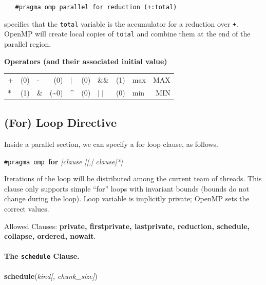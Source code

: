 \documentclass[a4paper]{report}
\begin{document}
\verb!   #pragma omp parallel for reduction (+:total)!

\noindent
specifies that the {\tt total} variable is the accumulator for a
reduction over {\tt +}. OpenMP will create local copies of {\tt total} and 
combine them at the end of the parallel region.

{\bf Operators (and their associated initial value)}
  \begin{center}
    \begin{tabular}{l r | l r | l r | l r | l r}
      + & (0) & -  &  (0) &    $\mid$ & (0) & \&\& & (1) & max & MAX\\
      * & (1) & \& & (\~{}0) & \^{} & (0) &   $\mid\mid$ & (0) & min & MIN\\ 
    \end{tabular}
  \end{center}

\subsection*{(For) Loop Directive} Inside a parallel section, we can
specify a for loop clause, as follows.

  \begin{center}
    {\tt \#pragma omp }{\bf for} {\it [clause [[,] clause]*]}
  \end{center}

    Iterations of the loop will be distributed among the
      current team of threads.
    This clause only supports simple ``for'' loops with invariant bounds (bounds do
      not change during the loop).
    Loop variable is implicitly private; OpenMP sets the
      correct values.

  Allowed Clauses: {\bf private, firstprivate, lastprivate, reduction, schedule,
    collapse, ordered, nowait}.

\paragraph{The {\tt schedule} Clause.}

  \begin{center}
    {\bf schedule}({\it kind[, chunk\_size]})
  \end{center}
\end{document}
